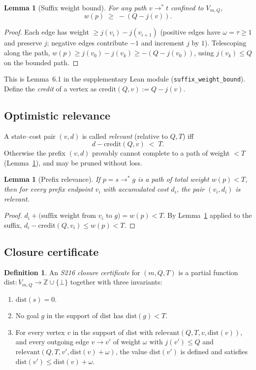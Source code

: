 \documentclass[11pt,a4paper]{article}
\theoremstyle{plain}
\newtheorem{lemma}[theorem]{Lemma}
\theoremstyle{definition}
\newtheorem{definition}[theorem]{Definition}
\theoremstyle{plain}
\newcommand{\ZZ}{\mathbb{Z}}
\newcommand{\credit}{\mathrm{credit}}
\newcommand{\relevant}{\mathrm{relevant}}
\begin{document}
\begin{lemma}[Suffix weight bound]\label{lem:suffix}
For any path $v \to^* t$ confined to $V_{m,Q}$,
\[
  w(p) \;\ge\; -(Q - j(v)).
\]
\end{lemma}

\begin{proof}
Each edge has weight $\ge j(v_i) - j(v_{i+1})$
(positive edges have $\omega = \tau \ge 1$ and preserve $j$;
negative edges contribute $-1$ and increment $j$ by $1$).
Telescoping along the path,
$w(p) \ge j(v_0) - j(v_k) \ge -(Q - j(v_0))$,
using $j(v_k) \le Q$ on the bounded path.
\end{proof}

This is Lemma~6.1 in the supplementary Lean module
(\texttt{suffix\_weight\_bound}). Define the \emph{credit} of a
vertex as $\credit(Q, v) := Q - j(v)$.

\subsection{Optimistic relevance}
A state--cost pair $(v, d)$ is called \emph{relevant} (relative to
$Q, T$) iff
\[
  d - \credit(Q, v) \;<\; T.
\]
Otherwise the prefix $(v, d)$ provably cannot complete to a path of
weight $< T$ (Lemma~\ref{lem:suffix}), and may be pruned without loss.

\begin{lemma}[Prefix relevance]\label{lem:relevance}
If $p = s \to^* g$ is a path of total weight $w(p) < T$, then for
every prefix endpoint $v_i$ with accumulated cost $d_i$, the pair
$(v_i, d_i)$ is relevant.
\end{lemma}

\begin{proof}
$d_i + \text{(suffix weight from $v_i$ to $g$)} = w(p) < T$.
By Lemma~\ref{lem:suffix} applied to the suffix,
$d_i - \credit(Q, v_i) \le w(p) < T$.
\end{proof}

\subsection{Closure certificate}
\begin{definition}\label{def:cert}
An \emph{S216 closure certificate} for $(m, Q, T)$ is a partial
function $\mathrm{dist} : V_{m,Q} \to \ZZ \cup \{\bot\}$ together
with three invariants:
\begin{enumerate}
\item[(C1)] $\mathrm{dist}(s) = 0$.
\item[(C2)] No goal $g$ in the support of $\mathrm{dist}$ has
            $\mathrm{dist}(g) < T$.
\item[(C3)] For every vertex $v$ in the support of $\mathrm{dist}$
            with $\relevant(Q, T, v, \mathrm{dist}(v))$,
            and every outgoing edge $v \to v'$ of weight $\omega$
            with $j(v') \le Q$ and
            $\relevant(Q, T, v', \mathrm{dist}(v) + \omega)$,
            the value $\mathrm{dist}(v')$ is defined and satisfies
            $\mathrm{dist}(v') \le \mathrm{dist}(v) + \omega$.
\end{enumerate}
\end{definition}
\end{document}
